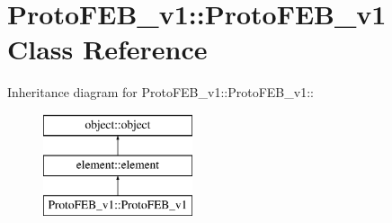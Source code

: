 \hypertarget{classProtoFEB__v1_1_1ProtoFEB__v1}{
\section{ProtoFEB\_\-v1::ProtoFEB\_\-v1 Class Reference}
\label{classProtoFEB__v1_1_1ProtoFEB__v1}
}
Inheritance diagram for ProtoFEB\_\-v1::ProtoFEB\_\-v1::\begin{figure}[H]
\begin{center}
\leavevmode
\includegraphics[height=3cm]{classProtoFEB__v1_1_1ProtoFEB__v1}
\end{center}
\end{figure}
